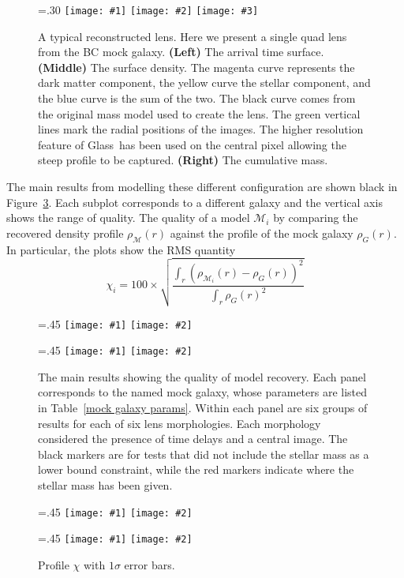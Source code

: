 \documentclass[galley,usenatbib]{mn2e}
\newcommand{\Glass}{{\sc Glass}}
\newcommand{\M}{\ensuremath{\mathscr{M}}}
\newcommand{\tabref}[1] {Table~\ref{#1}}
\newcommand{\figref}[1] {Figure~\ref{#1}}
\newcommand\plottwo[2]{{%
 \centering
 \leavevmode
 \columnwidth=.45\columnwidth
 \texttt{[image: \#1]}%
 \hfil
 \texttt{[image: \#2]}%
}}%
\newcommand\plotthree[3]{{%
 \centering
 \leavevmode
 \columnwidth=.30\columnwidth
 \texttt{[image: \#1]}%
 \hfil
 \texttt{[image: \#2]}%
 \hfil
 \texttt{[image: \#3]}%
}}%
\begin{document}
\begin{figure}
\plotthree{BCQuadR1a_TmS-a.pdf}{BCQuadR1a_TmS-b.pdf}{BCQuadR1a_TmS-c.pdf}
\caption{A typical reconstructed lens. Here we present a single quad lens from 
the BC mock galaxy.
\textbf{(Left)}
The arrival time surface. 
\textbf{(Middle)}
The surface density. The magenta curve represents the dark matter component,
the yellow curve the stellar component, and the blue curve is the sum of the two.
The black curve comes from the original mass model used to create the lens.
The green vertical lines mark the radial positions of the images. The higher
resolution feature of \Glass\ has been used on the central pixel allowing the
steep profile to be captured.
\textbf{(Right)}
The cumulative mass.}
\label{reconstruction}
\end{figure}

The main results from modelling these different configuration are shown black in
\figref{main results}. Each subplot corresponds to a different galaxy and
the vertical axis shows the range of quality.  The quality of a
model $\M_i$ by comparing the recovered density profile $\rho_\M(r)$ against
the profile of the mock galaxy $\rho_G(r)$.  In particular, the plots show the
RMS quantity
%
\begin{equation}
  \chi_i = 100 \times \sqrt{\frac{\int_r (\rho_{\M_i}(r) - \rho_G(r))^2}{\int_r \rho_G(r)^2}}
\end{equation}
%

\begin{figure}
\plottwo{AAchi2_profile-full.pdf}{BBchi2_profile-full.pdf}

\plottwo{ACchi2_profile-full.pdf}{BCchi2_profile-full.pdf}
\caption{The main results showing the quality of model recovery. Each panel corresponds to 
the named mock galaxy, whose parameters are listed in \tabref{mock galaxy params}. Within
each panel are six groups of results for each of six lens morphologies. Each morphology
considered the presence of time delays and a central image. The black markers are for tests
that did not include the stellar mass as a lower bound constraint, while the red markers
indicate where the stellar mass has been given.}
\label{main results}
\end{figure}

\begin{figure}
\plottwo{AAchi2_profile.pdf}{BBchi2_profile.pdf}

\plottwo{ACchi2_profile.pdf}{BCchi2_profile.pdf}
\caption{Profile $\chi$ with $1\sigma$ error bars.}
\label{main results}
\end{figure}
\end{document}
